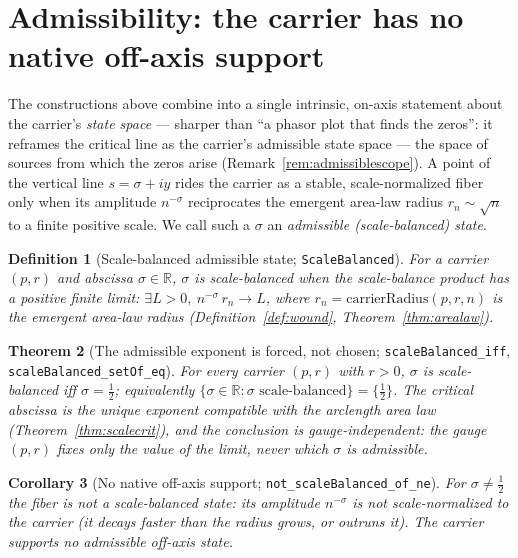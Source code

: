 \documentclass[11pt]{article}
\newtheorem{definition}{Definition}[section]
\newtheorem{theorem}[definition]{Theorem}
\newtheorem{corollary}[definition]{Corollary}
\newcommand{\R}{\mathbb{R}}
\newcommand{\code}[1]{\texttt{#1}}
\begin{document}
\section{Admissibility: the carrier has no native off-axis support}\label{sec:admissible}

The constructions above combine into a single intrinsic, on-axis statement about the carrier's
\emph{state space} --- sharper than ``a phasor plot that finds the zeros'': it reframes the critical
line as the carrier's admissible state space --- the space of sources from which the zeros arise
(Remark~\ref{rem:admissiblescope}). A point of the vertical line $s=\sigma+iy$ rides the carrier as a stable,
scale-normalized fiber only when its amplitude $n^{-\sigma}$ reciprocates the emergent area-law radius
$r_n\sim\sqrt n$ to a finite positive scale. We call such a $\sigma$ an \emph{admissible
(scale-balanced) state}.

\begin{definition}[Scale-balanced admissible state; \code{ScaleBalanced}]\label{def:admissible}
For a carrier $(p,r)$ and abscissa $\sigma\in\R$, $\sigma$ is \emph{scale-balanced} when the
scale-balance product has a positive finite limit: $\exists L>0,\ n^{-\sigma}\,r_n\to L$, where
$r_n=\mathrm{carrierRadius}(p,r,n)$ is the emergent area-law radius (Definition~\ref{def:wound},
Theorem~\ref{thm:arealaw}).
\end{definition}

\begin{theorem}[The admissible exponent is forced, not chosen; \code{scaleBalanced\_iff}, \code{scaleBalanced\_setOf\_eq}]\label{thm:admissible}
For every carrier $(p,r)$ with $r>0$, $\sigma$ is scale-balanced \emph{iff} $\sigma=\tfrac12$;
equivalently $\{\sigma\in\R:\sigma\text{ scale-balanced}\}=\{\tfrac12\}$. The critical abscissa is the
\emph{unique} exponent compatible with the arclength area law (Theorem~\ref{thm:scalecrit}), and the
conclusion is gauge-independent: the gauge $(p,r)$ fixes only the value of the limit, never which
$\sigma$ is admissible.
\end{theorem}

\begin{corollary}[No native off-axis support; \code{not\_scaleBalanced\_of\_ne}]\label{cor:offaxis}
For $\sigma\neq\tfrac12$ the fiber is \emph{not} a scale-balanced state: its amplitude $n^{-\sigma}$ is
not scale-normalized to the carrier (it decays faster than the radius grows, or outruns it). The
carrier supports no admissible off-axis state.
\end{corollary}
\end{document}
